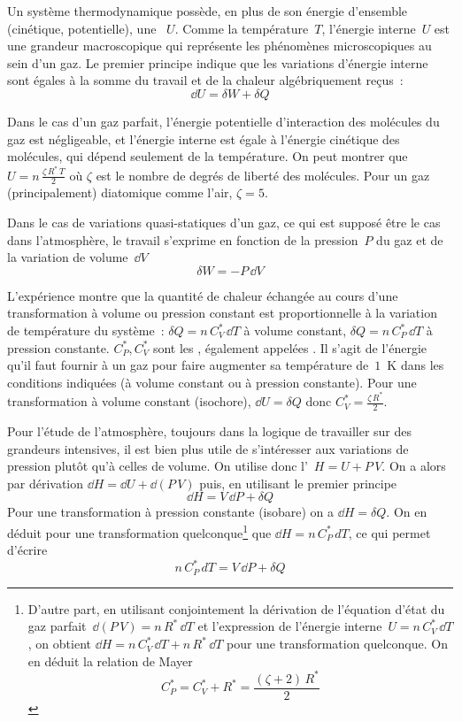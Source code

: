 \sk
Un système thermodynamique possède, en plus de son énergie d'ensemble (cinétique, potentielle), une ~$U$. Comme la température~$T$, l'énergie interne~$U$ est une grandeur macroscopique qui représente les phénomènes microscopiques au sein d'un gaz. Le premier principe indique que les variations d'énergie interne sont égales à la somme du travail et de
la chaleur algébriquement reçus~:
\[ \dd U = \delta W + \delta Q\]

\sk
Dans le cas d'un gaz parfait, l'énergie potentielle d'interaction des molécules du gaz est négligeable, et l'énergie interne est égale à l'énergie cinétique des molécules, qui dépend seulement de la température. On peut montrer que $U = n \, \frac{\zeta \, R^* \, T}{2}$ où $\zeta$ est le nombre de degrés de liberté des molécules. Pour un gaz (principalement) diatomique comme l'air, $\zeta = 5$. 

\sk
Dans le cas de variations quasi-statiques d'un gaz, ce qui est supposé être le cas dans l'atmosphère, le travail s'exprime en fonction de la pression~$P$ du gaz et de la variation de volume~$\dd V$
\[ \delta W = - P \, \dd V \]

\sk
L'expérience montre que la quantité de chaleur échangée au cours d'une transformation à volume ou pression constant est proportionnelle à la variation de température du système~: $\delta Q = n \, C_V^* \, \dd T$ à volume constant, $\delta Q = n \, C_P^* \, \dd T$ à pression constante. $C_P^*, C_V^*$ sont les , également appelées . Il s'agit de l'énergie qu'il faut fournir à un gaz pour faire augmenter sa température de~$1$~K dans les conditions indiquées (à volume constant ou à pression constante). Pour une transformation à volume constant (isochore), $\dd U = \delta Q$ donc $C_V^*=\frac{\zeta \, R^*}{2}$.

\sk
Pour l'étude de l'atmosphère, toujours dans la logique de travailler sur des grandeurs intensives, il est  bien plus utile de s'intéresser aux variations de pression plutôt qu'à celles de volume. On utilise donc l'~$H = U + P \, V$. On a alors par dérivation $ \dd H = \dd U + \dd (P\,V) $ puis, en utilisant le premier principe
\[ \dd H = V \, \dd P + \delta Q \]
Pour une transformation à pression constante (isobare) on a $\dd H = \delta Q$. On en déduit pour une transformation quelconque\footnote{
D'autre part, en utilisant conjointement la dérivation de l'équation d'état du gaz parfait~$\dd (P\,V) = n \, R^* \, \dd T$ et l'expression de l'énergie interne~$U = n \, C_V^* \, \dd T$, on obtient $\dd H = n \, C_V^* \, \dd T + n \, R^* \, \dd T$ pour une transformation quelconque. On en déduit la relation de Mayer \[ C_P^* = C_V^* + R^* = \frac{(\zeta+2) \, R^*}{2}\]
} 
que $\dd H = n \, C_P^* \, dT$, ce qui permet d'écrire
\[ n \, C_P^* \, dT = V \, \dd P + \delta Q \]



